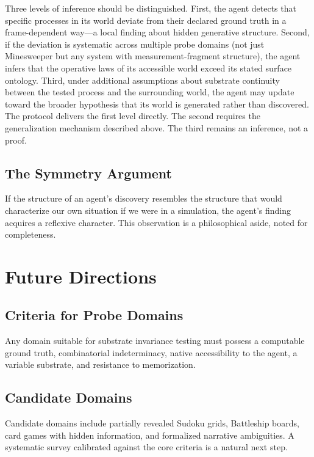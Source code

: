 \documentclass[12pt,a4paper]{article}
\begin{document}
Three levels of inference should be distinguished. First, the agent detects that specific processes in its world deviate from their declared ground truth in a frame-dependent way---a local finding about hidden generative structure. Second, if the deviation is systematic across multiple probe domains (not just Minesweeper but any system with measurement-fragment structure), the agent infers that the operative laws of its accessible world exceed its stated surface ontology. Third, under additional assumptions about substrate continuity between the tested process and the surrounding world, the agent may update toward the broader hypothesis that its world is generated rather than discovered. The protocol delivers the first level directly. The second requires the generalization mechanism described above. The third remains an inference, not a proof.

\subsection{The Symmetry Argument}
\label{sec:symmetry}

If the structure of an agent's discovery resembles the structure that would characterize our own situation if we were in a simulation, the agent's finding acquires a reflexive character. This observation is a philosophical aside, noted for completeness.

\section{Future Directions}
\label{sec:future}

\subsection{Criteria for Probe Domains}
\label{sec:criteria}

Any domain suitable for substrate invariance testing must possess a computable ground truth, combinatorial indeterminacy, native accessibility to the agent, a variable substrate, and resistance to memorization.

\subsection{Candidate Domains}
\label{sec:candidates}

Candidate domains include partially revealed Sudoku grids, Battleship boards, card games with hidden information, and formalized narrative ambiguities. A systematic survey calibrated against the core criteria is a natural next step.
\end{document}
